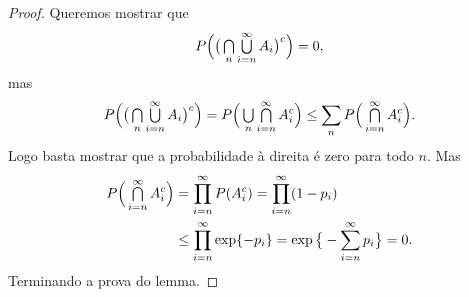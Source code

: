 \begin{proof}
  Queremos mostrar que
  \begin{equation}
    P \Big( \big(\operatorname*{{\textstyle \bigcap}}_n \operatorname*{{\textstyle \bigcup}}_{i=n}^\infty A_i\big)^c \Big) = 0,
  \end{equation}
  mas
  \begin{equation}
    P \Big( \big(\operatorname*{{\textstyle \bigcap}}_n \operatorname*{{\textstyle \bigcup}}_{i=n}^\infty A_i\big)^c \Big) = P \Big(\operatorname*{{\textstyle \bigcup}}_n \operatorname*{{\textstyle \bigcap}}_{i=n}^\infty A_i^c \Big) \leq \sum\limits_n P \Big(\operatorname*{{\textstyle \bigcap}}_{i=n}^\infty A_i^c \Big).
  \end{equation}
  Logo basta mostrar que a probabilidade à direita é zero para todo $n$.
  Mas
  \begin{equation}
    \begin{split}
      P \Big(\operatorname*{{\textstyle \bigcap}}_{i=n}^\infty A_i^c \Big) & = \prod\limits_{i=n}^\infty P(A_i^c) = \prod\limits_{i=n}^\infty (1 - p_i)\\
      & \leq \prod\limits_{i=n}^\infty \exp\{-p_i\} = \exp\big\{- \sum_{i=n}^\infty p_i\big\} = 0.
    \end{split}
  \end{equation}
  Terminando a prova do lemma.
\end{proof}


